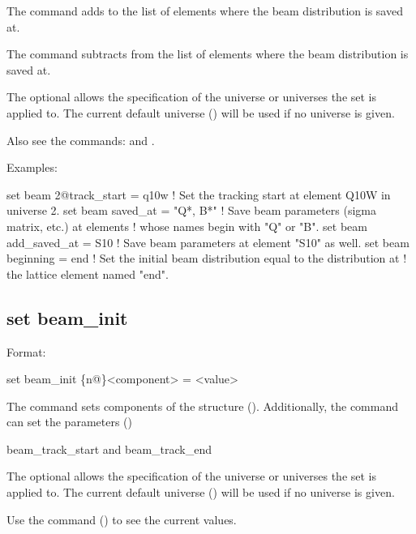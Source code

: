 {{The  command adds to the list of elements where the beam
distribution is saved at.

The  command subtracts from the list of elements where the beam
distribution is saved at.

The optional  allows the specification of the universe or universes the set is applied to.
The current default universe () will be used if no universe is given.

Also see the commands:  and .

Examples:
\begin{example}
  set beam 2@track_start = q10w  ! Set the tracking start at element Q10W in universe 2.
  set beam saved_at = "Q*, B*"   ! Save beam parameters (sigma matrix, etc.) at elements
                                 !  whose names begin with "Q" or "B".
  set beam add_saved_at = S10    ! Save beam parameters at element "S10" as well.
  set beam beginning = end       ! Set the initial beam distribution equal to the distribution at
                                 !  the lattice element named "end".
\end{example}


\subsection{set beam_init}
\label{s:set.beam.init}

Format:
\begin{example}
  set beam_init \{n@\}<component> = <value>
\end{example}

The  command sets components of the  structure ().
Additionally, the  command can set the parameters ()
\begin{example}
  beam_track_start  and
  beam_track_end
\end{example}

The optional  allows the specification of the universe or universes the set is applied to.
The current default universe () will be used if no universe is given. 

Use the  command () to see the current values.

}}

